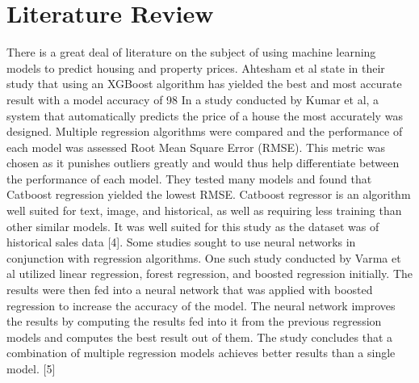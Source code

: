 \documentclass[conference]{IEEEtran}
\begin{document}
\section{Literature Review}
There is a great deal of literature on the subject of using machine learning models to predict housing and property prices. Ahtesham et al state in their study that using an XGBoost algorithm has yielded the best and most accurate result with a model accuracy of 98%
	In a study conducted by Kumar et al, a system that automatically predicts the price of a house the most accurately was designed. Multiple regression algorithms were compared and the performance of each model was assessed Root Mean Square Error (RMSE). This metric was chosen as it punishes outliers greatly and would thus help differentiate between the performance of each model. They tested many models and found that Catboost regression yielded the lowest RMSE. Catboost regressor is an algorithm well suited for text, image, and historical, as well as requiring less training than other similar models. It was well suited for this study as the dataset was of historical sales data [4].   
	Some studies sought to use neural networks in conjunction with regression algorithms. One such study conducted by Varma et al utilized linear regression, forest regression, and boosted regression initially. The results were then fed into a neural network that was applied with boosted regression to increase the accuracy of the model. The neural network improves the results by computing the results fed into it from the previous regression models and computes the best result out of them. The study concludes that a combination of multiple regression models achieves better results than a single model. [5]   
\end{document}

